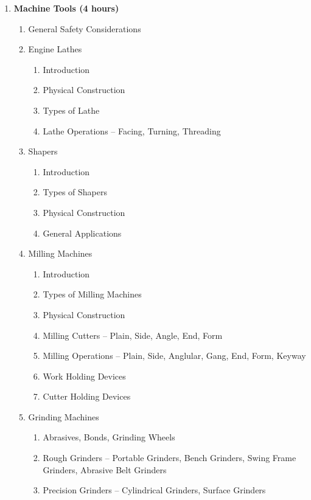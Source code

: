 \begin{enumerate}
    \item \textbf{Machine Tools \hfill (4 hours)}
    \begin{enumerate}
        \item General Safety Considerations
        \item Engine Lathes
        \begin{enumerate}
            \item Introduction
            \item Physical Construction
            \item Types of Lathe
            \item Lathe Operations -- Facing, Turning, Threading
        \end{enumerate}
        \item Shapers
        \begin{enumerate}
            \item Introduction
            \item Types of Shapers
            \item Physical Construction
            \item General Applications
        \end{enumerate}
        \item Milling Machines
        \begin{enumerate}
            \item Introduction
            \item Types of Milling Machines
            \item Physical Construction
            \item Milling Cutters -- Plain, Side, Angle, End, Form
            \item Milling Operations -- Plain, Side, Anglular, Gang, End, Form, Keyway
            \item Work Holding Devices
            \item Cutter Holding Devices
        \end{enumerate}
        \item Grinding Machines
        \begin{enumerate}
            \item Abrasives, Bonds, Grinding Wheels
            \item Rough Grinders -- Portable Grinders, Bench Grinders, Swing Frame Grinders, Abrasive Belt Grinders
            \item Precision Grinders -- Cylindrical Grinders, Surface Grinders
        \end{enumerate}
    \end{enumerate}
    

\end{enumerate}
